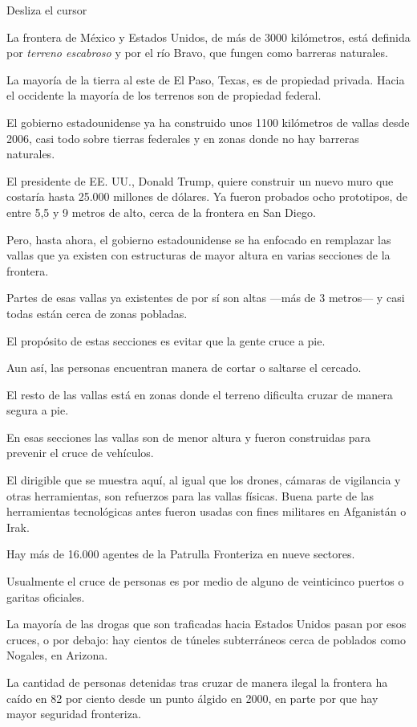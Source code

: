 Desliza el cursor

La frontera de México y Estados Unidos, de más de 3000 kilómetros, está
definida por \emph{terreno escabroso} y por el río Bravo, que fungen
como barreras naturales.

La mayoría de la tierra al este de El Paso, Texas, es de propiedad
privada. Hacia el occidente la mayoría de los terrenos son de propiedad
federal.

El gobierno estadounidense ya ha construido unos 1100 kilómetros de
vallas desde 2006, casi todo sobre tierras federales y en zonas donde no
hay barreras naturales.

El presidente de EE. UU., Donald Trump, quiere construir un nuevo muro
que costaría hasta 25.000 millones de dólares. Ya fueron probados ocho
prototipos, de entre 5,5 y 9 metros de alto, cerca de la frontera en San
Diego.

Pero, hasta ahora, el gobierno estadounidense se ha enfocado en
remplazar las vallas que ya existen con estructuras de mayor altura en
varias secciones de la frontera.

Partes de esas vallas ya existentes de por sí son altas ---más de 3
metros--- y casi todas están cerca de zonas pobladas.

El propósito de estas secciones es evitar que la gente cruce a pie.

Aun así, las personas encuentran manera de cortar o saltarse el cercado.

El resto de las vallas está en zonas donde el terreno dificulta cruzar
de manera segura a pie.

En esas secciones las vallas son de menor altura y fueron construidas
para prevenir el cruce de vehículos.

El dirigible que se muestra aquí, al igual que los drones, cámaras de
vigilancia y otras herramientas, son refuerzos para las vallas físicas.
Buena parte de las herramientas tecnológicas antes fueron usadas con
fines militares en Afganistán o Irak.

Hay más de 16.000 agentes de la Patrulla Fronteriza en nueve sectores.

Usualmente el cruce de personas es por medio de alguno de veinticinco
puertos o garitas oficiales.

La mayoría de las drogas que son traficadas hacia Estados Unidos pasan
por esos cruces, o por debajo: hay cientos de túneles subterráneos cerca
de poblados como Nogales, en Arizona.

La cantidad de personas detenidas tras cruzar de manera ilegal la
frontera ha caído en 82 por ciento desde un punto álgido en 2000, en
parte por que hay mayor seguridad fronteriza.

